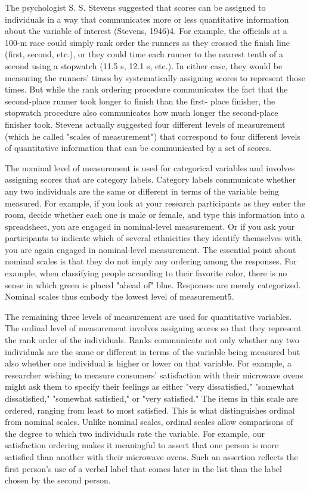 The psychologist S. S. Stevens suggested that scores can be assigned to individuals in a way that communicates more or less quantitative information about the variable of interest (Stevens, 1946)4. For example, the officials at a 100-m race could simply rank order the runners as they crossed the finish line (first, second, etc.), or they could time each runner to the nearest tenth of a second using a stopwatch (11.5 s, 12.1 s, etc.). In either case, they would be measuring the runners' times by systematically assigning scores to represent those times. But while the rank ordering procedure communicates the fact that the second-place runner took longer to finish than the first- place finisher, the stopwatch procedure also communicates how much longer the second-place finisher took. Stevens actually suggested four different levels of measurement (which he called "scales of measurement") that correspond to four different levels of quantitative information that can be communicated by a set of scores.

The nominal level of measurement is used for categorical variables and involves assigning scores that are category labels. Category labels communicate whether any two individuals are the same or different in terms of the variable being measured. For example, if you look at your research participants as they enter the room, decide whether each one is male or female, and type this information into a spreadsheet, you are engaged in nominal-level measurement. Or if you ask your participants to indicate which of several ethnicities they identify themselves with, you are again engaged in nominal-level measurement. The essential point about nominal scales is that they do not imply any ordering among the responses. For example, when classifying people according to their favorite color, there is no sense in which green is placed "ahead of" blue. Responses are merely categorized. Nominal scales thus embody the lowest level of measurement5.

The remaining three levels of measurement are used for quantitative variables. The ordinal level of measurement involves assigning scores so that they represent the rank order of the individuals. Ranks communicate not only whether any two individuals are the same or different in terms of the variable being measured but also whether one individual is higher or lower on that variable. For example, a researcher wishing to measure consumers' satisfaction with their microwave ovens might ask them to specify their feelings as either "very dissatisfied," "somewhat dissatisfied," "somewhat satisfied," or "very satisfied." The items in this scale are ordered, ranging from least to most satisfied. This is what distinguishes ordinal from nominal scales. Unlike nominal scales, ordinal scales allow comparisons of the degree to which two individuals rate the variable. For example, our satisfaction ordering makes it meaningful to assert that one person is more satisfied than another with their microwave ovens. Such an assertion reflects the first person's use of a verbal label that comes later in the list than the label chosen by the second person.

